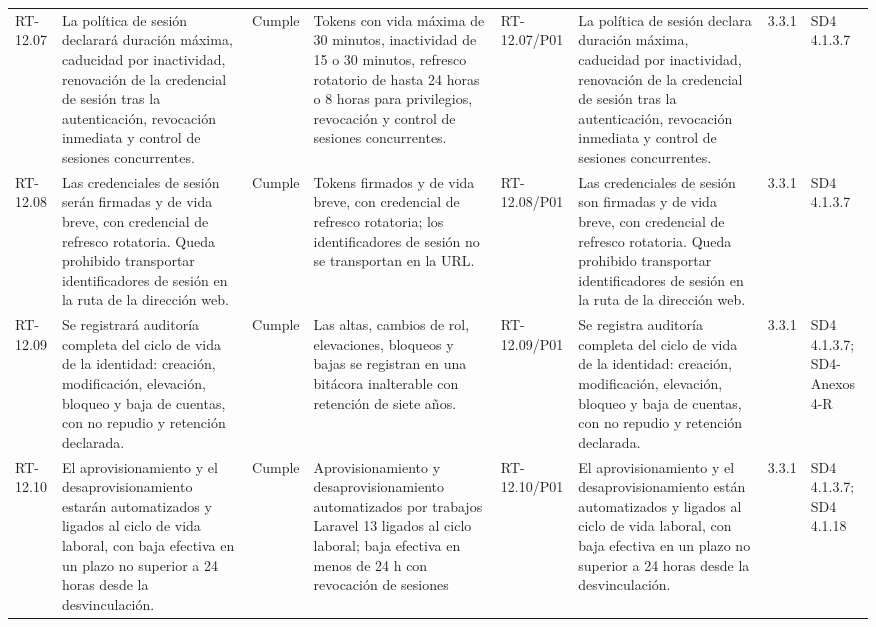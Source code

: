 \documentclass[oficio,firma,final]{lafrox}
\begin{document}
\begin{landscape}
{\begin{longtable}{@{}F{0.054} F{0.173} F{0.061} F{0.191} F{0.106} F{0.180} F{0.067} F{0.168}@{}}
  RT-12.07 & La política de sesión declarará duración máxima, caducidad por inactividad, renovación de la credencial de sesión tras la autenticación, revocación inmediata y control de sesiones concurrentes. & Cumple & Tokens con vida máxima de 30 minutos, inactividad de 15 o 30 minutos, refresco rotatorio de hasta 24 horas o 8 horas para privilegios, revocación y control de sesiones concurrentes. & RT-12.07/\allowbreak{}P01 & La política de sesión declara duración máxima, caducidad por inactividad, renovación de la credencial de sesión tras la autenticación, revocación inmediata y control de sesiones concurrentes. & 3.3.1 & SD4 4.1.3.7  \\
  RT-12.08 & Las credenciales de sesión serán firmadas y de vida breve, con credencial de refresco rotatoria. Queda prohibido transportar identificadores de sesión en la ruta de la dirección web. & Cumple & Tokens firmados y de vida breve, con credencial de refresco rotatoria; los identificadores de sesión no se transportan en la URL. & RT-12.08/\allowbreak{}P01 & Las credenciales de sesión son firmadas y de vida breve, con credencial de refresco rotatoria. Queda prohibido transportar identificadores de sesión en la ruta de la dirección web. & 3.3.1 & SD4 4.1.3.7  \\
  RT-12.09 & Se registrará auditoría completa del ciclo de vida de la identidad: creación, modificación, elevación, bloqueo y baja de cuentas, con no repudio y retención declarada. & Cumple & Las altas, cambios de rol, elevaciones, bloqueos y bajas se registran en una bitácora inalterable con retención de siete años. & RT-12.09/\allowbreak{}P01 & Se registra auditoría completa del ciclo de vida de la identidad: creación, modificación, elevación, bloqueo y baja de cuentas, con no repudio y retención declarada. & 3.3.1 & SD4 4.1.3.7; SD4-Anexos 4-R  \\
  RT-12.10 & El aprovisionamiento y el desaprovisionamiento estarán automatizados y ligados al ciclo de vida laboral, con baja efectiva en un plazo no superior a 24 horas desde la desvinculación. & Cumple & Aprovisionamiento y desaprovisionamiento automatizados por trabajos Laravel 13 ligados al ciclo laboral; baja efectiva en menos de 24 h con revocación de sesiones & RT-12.10/\allowbreak{}P01 & El aprovisionamiento y el desaprovisionamiento están automatizados y ligados al ciclo de vida laboral, con baja efectiva en un plazo no superior a 24 horas desde la desvinculación. & 3.3.1 & SD4 4.1.3.7; SD4 4.1.18  \\

\end{longtable}}
\end{landscape}
\end{document}
